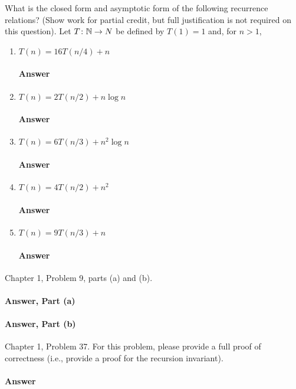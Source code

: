 \documentclass{article}
\begin{document}
What is the closed form and asymptotic form of the following recurrence
relations? (Show work for partial credit, but full justification is not required
on this question).
Let $T \colon {\mathbb N} \to N$ be defined by $T(1)=1$ and, for $n>1$,
\begin{enumerate}
    \item $T(n) = 16 T(n/4) + n$
        \paragraph{Answer} \todo{}
    \item $T(n) = 2 T(n/2) + n \log{n}$
        \paragraph{Answer} \todo{}
    \item $T(n) = 6 T(n/3) + n^2 \log{n}$
        \paragraph{Answer} \todo{}
    \item $T(n) = 4 T(n/2) + n^2$
        \paragraph{Answer} \todo{}
    \item $T(n) = 9 T(n/3) + n$
        \paragraph{Answer} \todo{}
\end{enumerate}


\collab{\todo{}}

Chapter 1, Problem 9, parts (a) and (b).

\paragraph{Answer, Part (a)}

\todo{}

\paragraph{Answer, Part (b)}

\todo{}

\collab{\todo{}}

Chapter 1, Problem 37.  For this problem, please provide a full proof of
correctness (i.e., provide a proof for the recursion invariant).

\paragraph{Answer}
\todo{}
\end{document}

